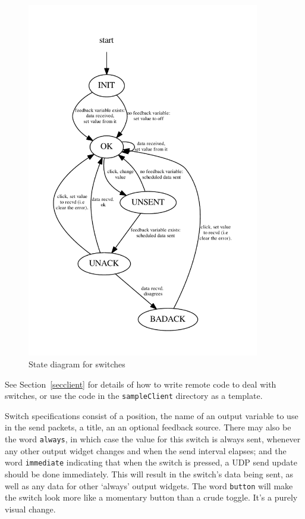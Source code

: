 \begin{figure}[ht]
\center
\includegraphics[width=4in]{stateSwitch.pdf}
\caption{State diagram for switches}
\label{switchstates}
\end{figure}
See Section~\ref{secclient} for details of how to write remote code to deal with switches,
or use the code in the \texttt{sampleClient} directory as a template.

Switch specifications consist of a position, the name of an
output variable to use in the send packets, a title,
an an optional feedback source. There may also be the word \verb+always+, in which case the value for this switch
is always sent, whenever any other output widget changes and when the send interval elapses; and the word \verb+immediate+ 
indicating that when the switch is pressed, a UDP send update should be done immediately. This will result in the
switch's data being sent, as well as any data for other `always' output widgets. The word \verb+button+ will make the switch
look more like a momentary button than a crude toggle. It's a purely visual change.

